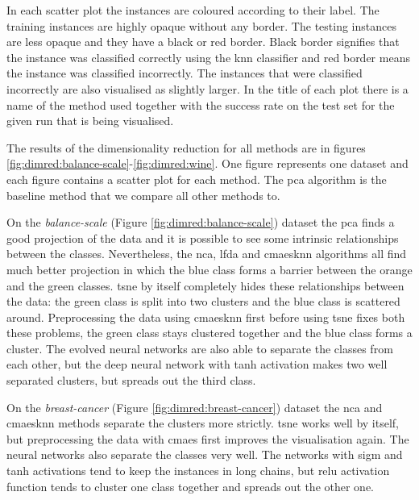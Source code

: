 \documentclass[12pt,a4paper]{report}
\begin{document}
In each scatter plot the instances are coloured according to their label. The training instances are highly opaque without any border. The testing instances are less opaque and they have a black or red border. Black border signifies that the instance was classified correctly using the \ac{knn} classifier and red border means the instance was classified incorrectly. The instances that were classified incorrectly are also visualised as slightly larger. In the title of each plot there is a name of the method used together with the success rate on the test set for the given run that is being visualised.

The results of the dimensionality reduction for all methods are in figures \ref{fig:dimred:balance-scale}-\ref{fig:dimred:wine}. One figure represents one dataset and each figure contains a scatter plot for each method. The \ac{pca} algorithm is the baseline method that we compare all other methods to. 

On the \textit{balance-scale} (Figure \ref{fig:dimred:balance-scale}) dataset the \ac{pca} finds a good projection of the data and it is possible to see some intrinsic relationships between the classes. Nevertheless, the \ac{nca}, \ac{lfda} and \ac{cmaesknn} algorithms all find much better projection in which the blue class forms a barrier between the orange and the green classes. \ac{tsne} by itself completely hides these relationships between the data: the green class is split into two clusters and the blue class is scattered around. Preprocessing the data using \ac{cmaesknn} first before using \ac{tsne} fixes both these problems, the green class stays clustered together and the blue class forms a cluster. The evolved neural networks are also able to separate the classes from each other, but the deep neural network with \ac{tanh} activation makes two well separated clusters, but spreads out the third class.

On the \textit{breast-cancer} (Figure \ref{fig:dimred:breast-cancer}) dataset the \ac{nca} and \ac{cmaesknn} methods separate the clusters more strictly. \ac{tsne} works well by itself, but preprocessing the data with \ac{cmaes} first improves the visualisation again. The neural networks also separate the classes very well. The networks with \ac{sigm} and \ac{tanh} activations tend to keep the instances in long chains, but \ac{relu} activation function tends to cluster one class together and spreads out the other one.
\end{document}
